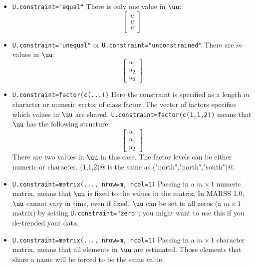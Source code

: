 \begin{itemize}\itemsep5pt
\item[] \texttt{U.constraint="equal"} There is only one value in $\uu$:
\begin{equation*}
 \left[ \begin{array}{c}
    u \\
    u \\
    u \end{array} \right]
\end{equation*}

\item[] \texttt{U.constraint="unequal"} or \texttt{U.constraint="unconstrained"} There are $m$ values in $\uu$: 
\begin{equation*}
 \left[ \begin{array}{c}
    u_1\\
    u_2\\
    u_3 \end{array} \right]
\end{equation*}

\item[] \texttt{U.constraint=factor(c(...))} Here the constraint is specified as a length $m$ character or numeric vector of class factor.  The vector of factors specifies which values in $\uu$ are shared.  \texttt{U.constraint=factor(c(1,1,2))} means that $\uu$ has the following structure:
\begin{equation*}
 \left[ \begin{array}{c}
    u_1 \\
    u_1 \\
    u_2 \end{array} \right]
\end{equation*}
There are two values in $\uu$ in this case.  The factor levels can be either numeric or character.  \verb@c(1,1,2)@ is the same as \verb@c("north","north","south")@.

\item[] \texttt{U.constraint=matrix(..., nrow=m, ncol=1)} Passing in a $m \times 1$ numeric matrix, means that $\uu$ is fixed to the values in the matrix. In MARSS 1.0, $\uu$ cannot vary in time, even if fixed.  $\uu$ can be set to all zeros (a $m \times 1$ matrix) by setting \texttt{U.constraint="zero"}; you might want to use this if you de-trended your data.

\item[] \texttt{U.constraint=matrix(..., nrow=m, ncol=1)} Passing in a $m \times 1$ character matrix, means that all elements in $\uu$ are estimated.  Those elements that share a name will be forced to be the same value.


\end{itemize}
